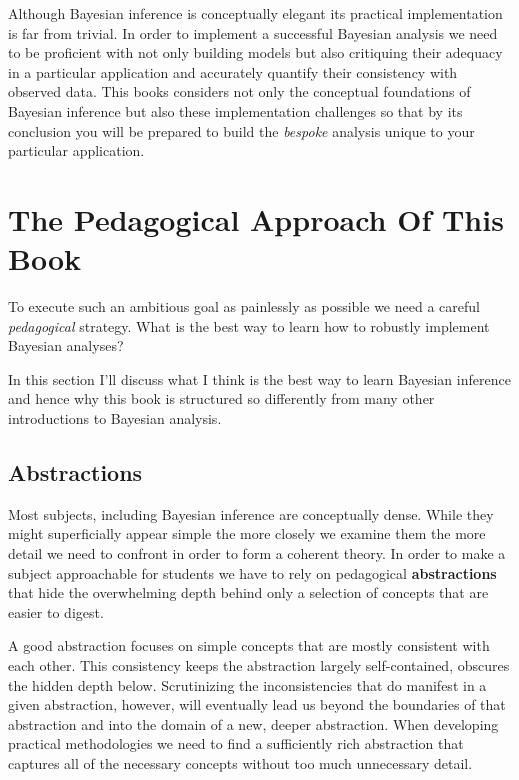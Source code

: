 \documentclass[
  letterpaper,
  DIV=11,
  numbers=noendperiod]{scrartcl}
\begin{document}
Although Bayesian inference is conceptually elegant its practical
implementation is far from trivial. In order to implement a successful
Bayesian analysis we need to be proficient with not only building models
but also critiquing their adequacy in a particular application and
accurately quantify their consistency with observed data. This books
considers not only the conceptual foundations of Bayesian inference but
also these implementation challenges so that by its conclusion you will
be prepared to build the \emph{bespoke} analysis unique to your
particular application.

\hypertarget{the-pedagogical-approach-of-this-book}{%
\section{The Pedagogical Approach Of This
Book}\label{the-pedagogical-approach-of-this-book}}

To execute such an ambitious goal as painlessly as possible we need a
careful \emph{pedagogical} strategy. What is the best way to learn how
to robustly implement Bayesian analyses?

In this section I'll discuss what I think is the best way to learn
Bayesian inference and hence why this book is structured so differently
from many other introductions to Bayesian analysis.

\hypertarget{abstractions}{%
\subsection{Abstractions}\label{abstractions}}

Most subjects, including Bayesian inference are conceptually dense.
While they might superficially appear simple the more closely we examine
them the more detail we need to confront in order to form a coherent
theory. In order to make a subject approachable for students we have to
rely on pedagogical \textbf{abstractions} that hide the overwhelming
depth behind only a selection of concepts that are easier to digest.

A good abstraction focuses on simple concepts that are mostly consistent
with each other. This consistency keeps the abstraction largely
self-contained, obscures the hidden depth below. Scrutinizing the
inconsistencies that do manifest in a given abstraction, however, will
eventually lead us beyond the boundaries of that abstraction and into
the domain of a new, deeper abstraction. When developing practical
methodologies we need to find a sufficiently rich abstraction that
captures all of the necessary concepts without too much unnecessary
detail.
\end{document}
